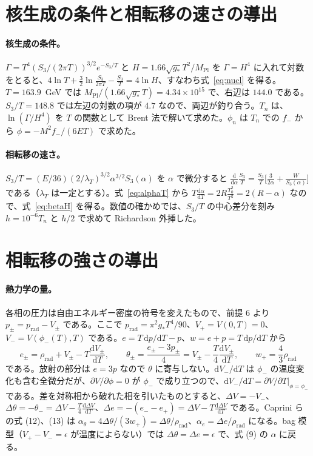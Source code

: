\documentclass[a4paper,10pt]{ltjsarticle}
\newcommand{\dd}{\mathrm{d}}
\begin{document}
\section{核生成の条件と相転移の速さの導出}\label{app:nucl}

\paragraph{核生成の条件。}$\Gamma=T^4(S_3/(2\pi T))^{3/2}e^{-S_3/T}$ と $H=1.66\sqrt{g_*}T^2/M_{\mathrm{Pl}}$ を $\Gamma=H^4$ に入れて対数をとると、$4\ln T+\frac32\ln\frac{S_3}{2\pi T}-\frac{S_3}{T}=4\ln H$、すなわち式~\eqref{eq:nucl} を得る。$T=163.9$~GeV では $M_{\mathrm{Pl}}/(1.66\sqrt{g_*}T)=4.34\times10^{15}$ で、右辺は $144.0$ である。$S_3/T=148.8$ では左辺の対数の項が $4.7$ なので、両辺が釣り合う。$T_n$ は、$\ln(\Gamma/H^4)$ を $T$ の関数として Brent 法で解いて求めた。$\phi_n$ は $T_n$ での $f_-$ から $\phi=-M^2f_-/(6ET)$ で求めた。

\paragraph{相転移の速さ。}$S_3/T=(E/36)(2/\lambda_T)^{3/2}\alpha^{3/2}S_3(\alpha)$ を $\alpha$ で微分すると $\frac{\dd}{\dd\alpha}\frac{S_3}{T}=\frac{S_3}{T}\bigl[\frac3{2\alpha}+\frac{W}{S_3(\alpha)}\bigr]$ である（$\lambda_T$ は一定とする）。式~\eqref{eq:alphaT} から $T\frac{\dd\alpha}{\dd T}=2R\frac{T_0^2}{T^2}=2(R-\alpha)$ なので、式~\eqref{eq:betaH} を得る。数値の確かめでは、$S_3/T$ の中心差分を刻み $h=10^{-6}T_n$ と $h/2$ で求めて Richardson 外挿した。

\section{相転移の強さの導出}\label{app:strength}

\paragraph{熱力学の量。}各相の圧力は自由エネルギー密度の符号を変えたもので、前提 6 より $p_\pm=p_{\mathrm{rad}}-V_\pm$ である。ここで $p_{\mathrm{rad}}=\pi^2g_*T^4/90$、$V_+=V(0,T)=0$、$V_-=V(\phi_-(T),T)$ である。$e=T\,\dd p/\dd T-p$、$w=e+p=T\,\dd p/\dd T$ から
\begin{equation*}
e_\pm=\rho_{\mathrm{rad}}+V_\pm-T\frac{\dd V_\pm}{\dd T},\qquad
\theta_\pm=\frac{e_\pm-3p_\pm}{4}=V_\pm-\frac T4\frac{\dd V_\pm}{\dd T},\qquad
w_+=\frac43\rho_{\mathrm{rad}}
\end{equation*}
である。放射の部分は $e=3p$ なので $\theta$ に寄与しない。$\dd V_-/\dd T$ は $\phi_-$ の温度変化も含む全微分だが、$\partial V/\partial\phi=0$ が $\phi_-$ で成り立つので、$\dd V_-/\dd T=\partial V/\partial T|_{\phi=\phi_-}$ である。差を対称相から破れた相を引いたものとすると、$\Delta V=-V_-$、$\Delta\theta=-\theta_-=\Delta V-\frac T4\frac{\dd\Delta V}{\dd T}$、$\Delta e=-(e_--e_+)=\Delta V-T\frac{\dd\Delta V}{\dd T}$ である。Caprini らの式 (12)、(13) は $\alpha_\theta=4\Delta\theta/(3w_+)=\Delta\theta/\rho_{\mathrm{rad}}$、$\alpha_e=\Delta e/\rho_{\mathrm{rad}}$ になる。bag 模型（$V_+-V_-=\epsilon$ が温度によらない）では $\Delta\theta=\Delta e=\epsilon$ で、式 (9) の $\alpha$ に戻る。
\end{document}
